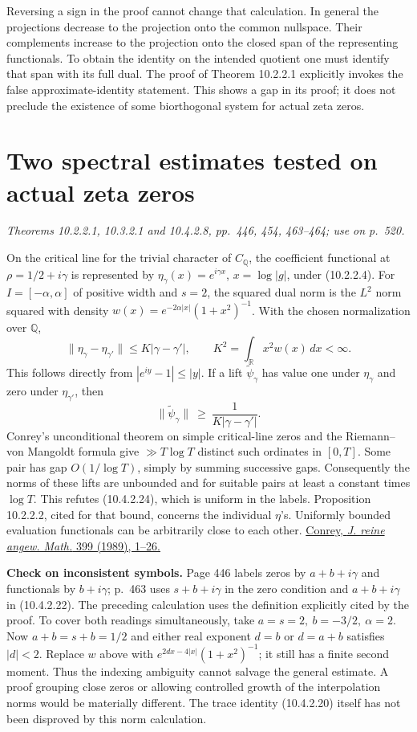 \documentclass[11pt,reqno]{amsart}
\numberwithin{equation}{section}
\newcommand{\Q}{\mathbb Q}\newcommand{\R}{\mathbb R}\newcommand{\C}{\mathbb C}\newcommand{\Z}{\mathbb Z}
\begin{document}
Reversing a sign in the proof cannot change that calculation. In general the projections decrease to the projection onto the common nullspace. Their complements increase to the projection onto the closed span of the representing functionals. To obtain the identity on the intended quotient one must identify that span with its full dual. The proof of Theorem 10.2.2.1 explicitly invokes the false approximate-identity statement. This shows a gap in its proof; it does not preclude the existence of some biorthogonal system for actual zeta zeros.


\section{Two spectral estimates tested on actual zeta zeros}\label{sec:7}

\textit{Theorems 10.2.2.1, 10.3.2.1 and 10.4.2.8, pp.~446, 454, 463--464; use on p.~520.}\par
On the critical line for the trivial character of \(C_\Q\), the coefficient functional at \(\rho=1/2+i\gamma\) is represented by \(\eta_\gamma(x)=e^{i\gamma x}\), \(x=\log |g|\), under (10.2.2.4). For \(I=[-\alpha,\alpha]\) of positive width and \(s=2\), the squared dual norm is the \(L^2\) norm squared with density \(w(x)=e^{-2\alpha|x|}(1+x^2)^{-1}\). With the chosen normalization over \(\Q\),
\[
 \|\eta_\gamma-\eta_{\gamma'}\|\le K|\gamma-\gamma'|,
 \qquad K^2=\int_\R x^2w(x)\,dx<\infty.
\]
This follows directly from \(|e^{iy}-1|\le |y|\). If a lift \(\widetilde\psi_\gamma\) has value one under \(\eta_\gamma\) and zero under \(\eta_{\gamma'}\), then
\[
       \|\widetilde\psi_\gamma\|\ \ge\ \frac{1}{K|\gamma-\gamma'|}.
\]
Conrey's unconditional theorem on simple critical-line zeros and the Riemann--von Mangoldt formula give \(\gg T\log T\) distinct such ordinates in \([0,T]\). Some pair has gap \(O(1/\log T)\), simply by summing successive gaps. Consequently the norms of these lifts are unbounded and for suitable pairs at least a constant times \(\log T\). This refutes (10.4.2.24), which is uniform in the labels. Proposition 10.2.2.2, cited for that bound, concerns the individual \(\eta\)'s. Uniformly bounded evaluation functionals can be arbitrarily close to each other. \href{https://doi.org/10.1515/crll.1989.399.1}{Conrey, \textit{J. reine angew. Math.} 399 (1989), 1--26.}

\textbf{Check on inconsistent symbols.} Page 446 labels zeros by \(a+b+i\gamma\) and functionals by \(b+i\gamma\); p.~463 uses \(s+b+i\gamma\) in the zero condition and \(a+b+i\gamma\) in (10.4.2.22). The preceding calculation uses the definition explicitly cited by the proof. To cover both readings simultaneously, take \(a=s=2,\ b=-3/2,\ \alpha=2\). Now \(a+b=s+b=1/2\) and either real exponent \(d=b\) or \(d=a+b\) satisfies \(|d|<2\). Replace \(w\) above with \(e^{2dx-4|x|}(1+x^2)^{-1}\); it still has a finite second moment. Thus the indexing ambiguity cannot salvage the general estimate. A proof grouping close zeros or allowing controlled growth of the interpolation norms would be materially different. The trace identity (10.4.2.20) itself has not been disproved by this norm calculation.
\end{document}

